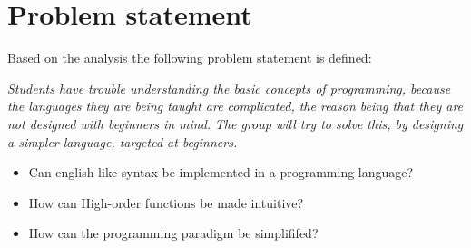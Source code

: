 \newpage
\section{Problem statement}
Based on the analysis the following problem statement is defined:
\begin{center}
	\textit{Students have trouble understanding the basic concepts of programming, because the languages they are being taught are complicated, the reason being that they are not designed with beginners in mind.}
	\textit{The group will try to solve this, by designing a simpler language, targeted at beginners.}

\begin{itemize}
	\item Can english-like syntax be implemented in a programming language?
	\item How can High-order functions be made intuitive?
	\item How can the programming paradigm be simplififed?
\end{itemize}
\end{center}
